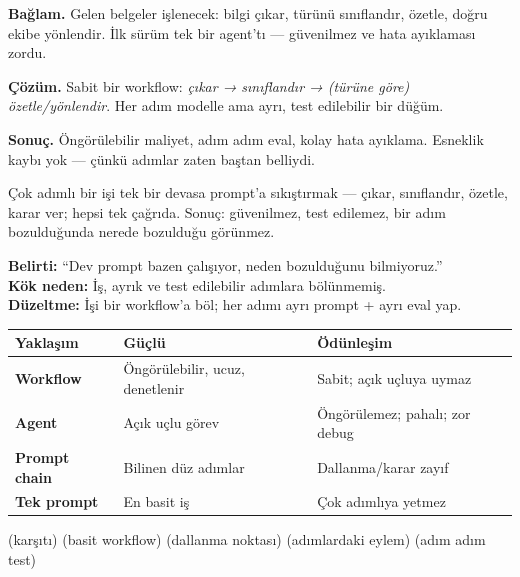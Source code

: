 \begin{prodbox}
\textbf{Bağlam.} Gelen belgeler işlenecek: bilgi çıkar, türünü sınıflandır,
özetle, doğru ekibe yönlendir. İlk sürüm tek bir agent'tı --- güvenilmez ve
hata ayıklaması zordu.

\smallskip
\textbf{Çözüm.} Sabit bir workflow: \emph{çıkar → sınıflandır → (türüne göre)
özetle/yönlendir}. Her adım modelle ama ayrı, test edilebilir bir düğüm.

\smallskip
\textbf{Sonuç.} Öngörülebilir maliyet, adım adım eval, kolay hata ayıklama.
Esneklik kaybı yok --- çünkü adımlar zaten baştan belliydi.
\end{prodbox}

\begin{antibox}
Çok adımlı bir işi tek bir devasa prompt'a sıkıştırmak --- çıkar, sınıflandır,
özetle, karar ver; hepsi tek çağrıda. Sonuç: güvenilmez, test edilemez, bir
adım bozulduğunda nerede bozulduğu görünmez.

\smallskip
\textbf{Belirti:} ``Dev prompt bazen çalışıyor, neden bozulduğunu bilmiyoruz.''\\
\textbf{Kök neden:} İş, ayrık ve test edilebilir adımlara bölünmemiş.\\
\textbf{Düzeltme:} İşi bir workflow'a böl; her adımı ayrı prompt + ayrı eval yap.
\end{antibox}

\vspace{2pt}
\begin{tabularx}{\linewidth}{@{}>{\raggedright\arraybackslash}p{26mm} L L@{}}
\toprule
{\sffamily\bfseries\small Yaklaşım} & {\sffamily\bfseries\small Güçlü} & {\sffamily\bfseries\small Ödünleşim} \\
\midrule
\textbf{Workflow} & Öngörülebilir, ucuz, denetlenir & Sabit; açık uçluya uymaz \\
\addlinespace[2pt]
\textbf{Agent} & Açık uçlu görev & Öngörülemez; pahalı; zor debug \\
\addlinespace[2pt]
\textbf{Prompt chain} & Bilinen düz adımlar & Dallanma/karar zayıf \\
\addlinespace[2pt]
\textbf{Tek prompt} & En basit iş & Çok adımlıya yetmez \\
\bottomrule
\end{tabularx}

 (karşıtı) \tlsep {} (basit workflow) \tlsep
{} (dallanma noktası) \tlsep {} (adımlardaki eylem) \tlsep
{} (adım adım test)

